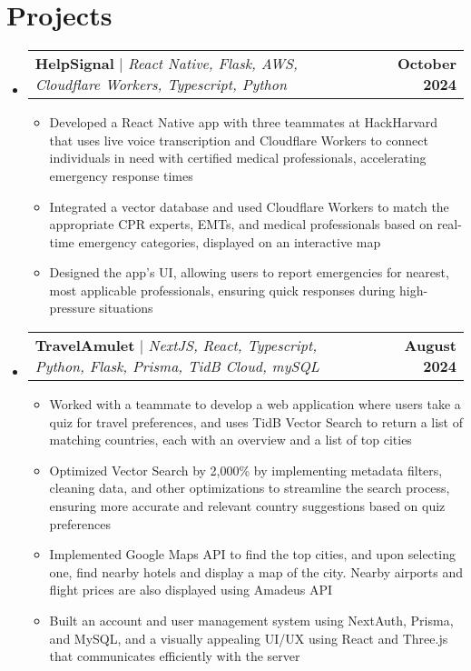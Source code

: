 \documentclass[letterpaper,11pt]{article}
\makeatletter
\newcommand{\resumeItem}[1]{
  \item\small{
    {#1 \vspace{-2pt}}
  }
}
\newcommand{\resumeProjectHeading}[2]{
    \item
    \begin{tabular*}{1.001\textwidth}{l@{\extracolsep{\fill}}r}
      \small#1 & \textbf{\small #2}\\
    \end{tabular*}\vspace{-7pt}
}
\newcommand{\resumeSubHeadingListStart}{\begin{itemize}[leftmargin=0.0in, label={}]}
\newcommand{\resumeSubHeadingListEnd}{\end{itemize}}
\newcommand{\resumeItemListStart}{\begin{itemize}}
\newcommand{\resumeItemListEnd}{\end{itemize}\vspace{-5pt}}
\makeatother
\begin{document}
\section{Projects}
  \vspace{-7pt}
    \resumeSubHeadingListStart
      \resumeProjectHeading
          {\textbf{HelpSignal} $|$ \emph{React Native, Flask, AWS, Cloudflare Workers, Typescript, Python}}{October 2024}
          \resumeItemListStart
            \resumeItem{Developed a React Native app with three teammates at HackHarvard that uses live voice transcription and Cloudflare Workers to connect individuals in need with certified medical professionals, accelerating emergency response times}
            \resumeItem{Integrated a vector database and used Cloudflare Workers to match the appropriate CPR experts, EMTs, and medical professionals based on real-time emergency categories, displayed on an interactive map}
            \resumeItem{Designed the app's UI, allowing users to report emergencies for nearest, most applicable professionals, ensuring quick responses during high-pressure situations}
        \resumeItemListEnd
      \vspace{-20pt} %
      \resumeProjectHeading
          {\textbf{TravelAmulet} $|$ \emph{NextJS, React, Typescript, Python, Flask, Prisma, TidB Cloud, mySQL}}{August 2024}
          \resumeItemListStart
            \resumeItem{Worked with a teammate to develop a web application where users take a quiz for travel preferences, and uses TidB Vector Search to return a list of matching countries, each with an overview and a list of top cities}
            \resumeItem{Optimized Vector Search by 2,000\% by implementing metadata filters, cleaning data, and other optimizations to streamline the search process, ensuring more accurate and relevant country suggestions based on quiz preferences}
            \resumeItem{Implemented Google Maps API to find the top cities, and upon selecting one, find nearby hotels and display a map of the city. Nearby airports and flight prices are also displayed using Amadeus API}
            \resumeItem{Built an account and user management system using NextAuth, Prisma, and MySQL, and a visually appealing UI/UX using React and Three.js that communicates efficiently with the server}
          \resumeItemListEnd
    \resumeSubHeadingListEnd
\end{document}
